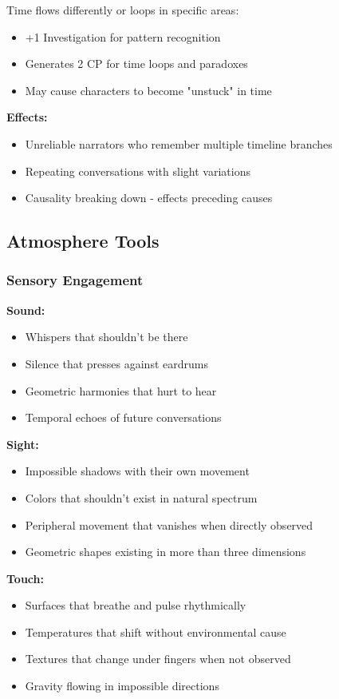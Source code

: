 \documentclass[11pt]{article}
\begin{document}
Time flows differently or loops in specific areas:
\begin{itemize}
\item +1 Investigation for pattern recognition
\item Generates 2 CP for time loops and paradoxes
\item May cause characters to become "unstuck" in time
\end{itemize}

\textbf{Effects:}
\begin{itemize}
\item Unreliable narrators who remember multiple timeline branches
\item Repeating conversations with slight variations
\item Causality breaking down - effects preceding causes
\end{itemize}

\subsection{Atmosphere Tools}

\subsubsection{Sensory Engagement}

\textbf{Sound:}
\begin{itemize}
\item Whispers that shouldn't be there
\item Silence that presses against eardrums
\item Geometric harmonies that hurt to hear
\item Temporal echoes of future conversations
\end{itemize}

\textbf{Sight:}
\begin{itemize}
\item Impossible shadows with their own movement
\item Colors that shouldn't exist in natural spectrum
\item Peripheral movement that vanishes when directly observed
\item Geometric shapes existing in more than three dimensions
\end{itemize}

\textbf{Touch:}
\begin{itemize}
\item Surfaces that breathe and pulse rhythmically
\item Temperatures that shift without environmental cause
\item Textures that change under fingers when not observed
\item Gravity flowing in impossible directions
\end{itemize}
\end{document}
